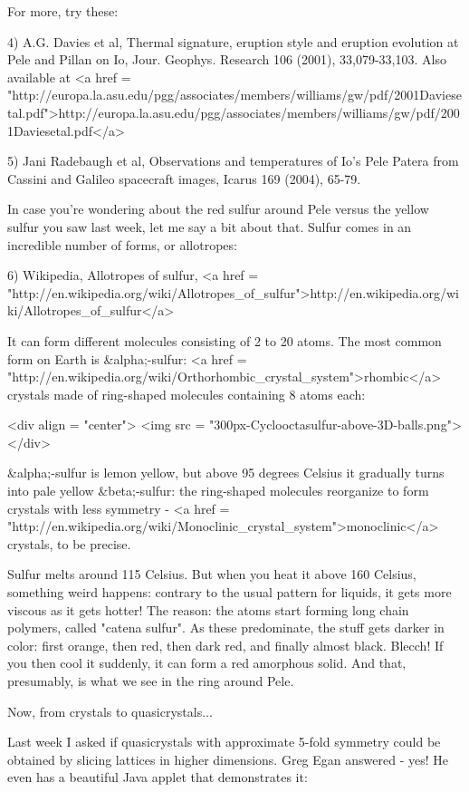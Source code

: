 For more, try these:

4) A.G. Davies et al, Thermal signature, eruption style and eruption
evolution at Pele and Pillan on Io, Jour. Geophys. Research 106
(2001), 33,079-33,103.  Also available at
<a href = "http://europa.la.asu.edu/pgg/associates/members/williams/gw/pdf/2001Daviesetal.pdf">http://europa.la.asu.edu/pgg/associates/members/williams/gw/pdf/2001Daviesetal.pdf</a>

5) Jani Radebaugh et al, Observations and temperatures of Io's 
Pele Patera from Cassini and Galileo spacecraft images, 
Icarus 169 (2004), 65-79.

In case you're wondering about the red sulfur around Pele versus the
yellow sulfur you saw last week, let me say a bit about that.  Sulfur
comes in an incredible number of forms, or allotropes:

6) Wikipedia, Allotropes of sulfur, <a href =
"http://en.wikipedia.org/wiki/Allotropes_of_sulfur">http://en.wikipedia.org/wiki/Allotropes_of_sulfur</a>

It can form different molecules consisting of 2 to 20 atoms.  The most
common form on Earth is &alpha;-sulfur: <a href =
"http://en.wikipedia.org/wiki/Orthorhombic_crystal_system">rhombic</a>
crystals made of ring-shaped molecules containing 8 atoms each:

<div align = "center">
<img src = "300px-Cyclooctasulfur-above-3D-balls.png">
</div>

&alpha;-sulfur is lemon yellow, but above 95 degrees Celsius it
gradually turns into pale yellow &beta;-sulfur: the ring-shaped
molecules reorganize to form crystals with less symmetry - <a href =
"http://en.wikipedia.org/wiki/Monoclinic_crystal_system">monoclinic</a>
crystals, to be precise.

Sulfur melts around 115 Celsius.  But when you heat it above 160
Celsius, something weird happens: contrary to the usual pattern for
liquids, it gets more viscous as it gets hotter!  The reason: the
atoms start forming long chain polymers, called "catena
sulfur".  As these predominate, the stuff gets darker in color:
first orange, then red, then dark red, and finally almost black.
Blecch!  If you then cool it suddenly, it can form a red amorphous
solid.  And that, presumably, is what we see in the ring around Pele.

Now, from crystals to quasicrystals...

Last week I asked if quasicrystals with approximate 5-fold symmetry 
could be obtained by slicing lattices in higher dimensions.  Greg 
Egan answered - yes!  He even has a beautiful Java applet that 
demonstrates it:

